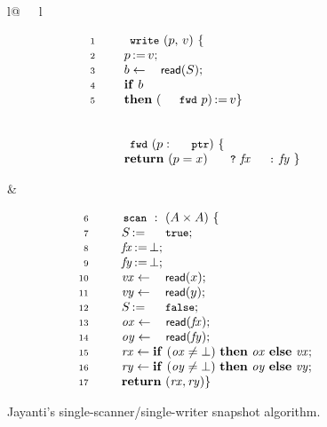 \documentclass[a4paper,UKenglish]{lipics-v2016}
\newcommand{\asgn}{\leftarrow}
\newcommand{\act}[1]{\textsf{\small{#1}}}
\newcommand{\esc}[1]{\text{\texttt{\small{#1}}}}
\newcommand{\kw}[1]{\text{\textbf{#1}}}
\newcommand{\var}[1]{\mathit{#1}}
\newcommand{\num}[1]{{\text{{\scriptsize{#1}}}}}
\def\tbnd{\asgn}
\newcommand{\actwrite}[2]{{#1}\,{:=}\,{#2}}
\theoremstyle{definition}
\begin{document}
\begin{figure}[t]
%
\centering
\begin{tabular}[t]{l@{\ \ \ }l}
%  
\begin{minipage}[t]{.4\textwidth}
\[
\begin{array}{rl}
\num{1}~ & \esc{write}\ (p,\, v)\ \{ \\ 
\num{2}~ & ~~~ \actwrite{p}{v}; \\
\num{3}~ & ~~~ b \tbnd \act{read}(\s);\\
\num{4}~ & ~~~ \kw{if}\ b\\
\num{5}~ & ~~~ \kw{then}\ \actwrite{\fwdp{p}}{v}\}\\
& \\
& \\
& \esc{fwd}\ (p : \esc{ptr})\ \{ \\
& ~~~ \kw{return}\ (p = x)\ \esc{?}\ \fx \esc{:}\ \fy\ \}
\end{array}
\]
\end{minipage}
%
&
\begin{minipage}[t]{.6\textwidth}
\[
\begin{array}{rl}
\num{6}~  & \esc{scan}\ :\ (A \times A)\ \{\\ 
\num{7}~  & ~~~~ \actwrite{\s}{\esc{true}};\\
\num{8}~  & ~~~~ \actwrite{\fx}{\bot};\\
\num{9}~  & ~~~~ \actwrite{\fy}{\bot}; \\
\num{10}~ & ~~~~ \var{vx} \tbnd \act{read}(\x);\\
\num{11}~ & ~~~~ \var{vy} \tbnd \act{read}(\y);\\
\num{12}~ & ~~~~ \actwrite{\s}{\esc{false}};\\
\num{13}~ & ~~~~ \var{ox} \tbnd \act{read}(\fx);\\
\num{14}~ & ~~~~ \var{oy} \tbnd \act{read}(\fy);\\
\num{15}~ & ~~~~ \var{rx} \tbnd \kw{if}\ (\var{ox} \neq\bot)\ \kw{then}\ \var{ox}\
                          \kw{else}\ \var{vx};\\  
\num{16}~ & ~~~~ \var{ry} \tbnd \kw{if}\ (\var{oy} \neq\bot)\ \kw{then}\ \var{oy}\
                          \kw{else}\ \var{vy};\\  
\num{17}~ & ~~~~ \kw{return}~(\var{rx},\var{ry})\}\\
\end{array}
\]
\end{minipage}
%
\end{tabular}
%
\caption{Jayanti's single-scanner/single-writer snapshot algorithm.}
\label{fig:jayanti-snapshot}
\end{figure}
\end{document}
